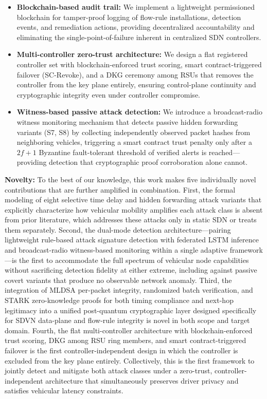 \documentclass[12pt, a4paper]{report}
\begin{document}
\begin{itemize}
    \item \textbf{Blockchain-based audit trail:} We implement a 
    lightweight permissioned blockchain for tamper-proof logging of 
    flow-rule installations, detection events, and remediation 
    actions, providing decentralized accountability and eliminating 
    the single-point-of-failure inherent in centralized SDN 
    controllers.

    \item \textbf{Multi-controller zero-trust architecture:}
We design a flat registered controller set with
blockchain-enforced trust scoring, smart
contract-triggered failover (SC-Revoke), and a
\ac{DKG} ceremony among \ac{RSU}s that removes the
controller from the key plane entirely, ensuring
control-plane continuity and cryptographic integrity
even under controller compromise.

\item \textbf{Witness-based passive attack detection:}
We introduce a broadcast-radio witness monitoring
mechanism that detects passive hidden forwarding
variants (S7, S8) by collecting independently
observed packet hashes from neighboring vehicles,
triggering a smart contract trust penalty only after
a $2f{+}1$ Byzantine fault-tolerant threshold of
verified alerts is reached---providing detection that
cryptographic proof corroboration alone cannot.

\end{itemize}


\textbf{Novelty:}
To the best of our knowledge, this work makes five
individually novel contributions that are further
amplified in combination.
First, the formal modeling of eight selective time
delay and hidden forwarding attack variants that
explicitly characterize how vehicular mobility
amplifies each attack class is absent from prior
literature, which addresses these attacks only in
static SDN or treats them separately.
Second, the dual-mode detection architecture---pairing
lightweight rule-based attack signature detection with
federated LSTM inference and broadcast-radio
witness-based monitoring within a single adaptive
framework---is the first to accommodate the full
spectrum of vehicular node capabilities without
sacrificing detection fidelity at either extreme,
including against passive covert variants that produce
no observable network anomaly.
Third, the integration of \ac{MLDSA} per-packet
integrity, randomized batch verification, and \ac{STARK}
zero-knowledge proofs for both timing compliance and
next-hop legitimacy into a unified post-quantum
cryptographic layer designed specifically for \ac{SDVN}
data-plane and flow-rule integrity is novel in both
scope and target domain.
Fourth, the flat multi-controller architecture with
blockchain-enforced trust scoring, \ac{DKG} among
\ac{RSU} ring members, and smart contract-triggered
failover is the first controller-independent design
in which the controller is excluded from the key
plane entirely.
Collectively, this is the first framework to jointly
detect and mitigate both attack classes under a
zero-trust, controller-independent architecture that
simultaneously preserves driver privacy and satisfies
vehicular latency constraints.
\end{document}
